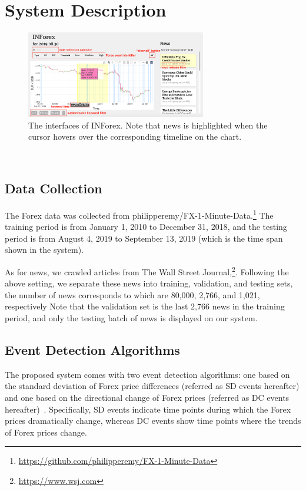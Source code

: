 \documentclass[runningheads]{llncs}
\begin{document}
\section{System Description}\label{sec:system}
\vspace{-0.9cm}
\begin{figure}
  \centering
  \includegraphics[width=0.7\textwidth]{hover.pdf}
  \caption{The interfaces of INForex. Note that news is highlighted when the cursor hovers over the
  corresponding timeline on the chart.}
  \label{fig:hover}
\end{figure}\
\vspace{-1.7cm}

\subsection{Data Collection}
\vspace{-0.3cm}
The Forex data was collected from
philipperemy/FX-1-Minute-Data.\footnote{\url{https://github.com/philipperemy/FX-1-Minute-Data}}
The training period is from January 1, 2010 to December 31, 2018, and the testing period is from August 4, 2019 to September 13, 2019 (which is the time span shown in the system). 

As for news, we crawled articles from The Wall Street
Journal,\footnote{\url{https://www.wsj.com}}. Following the above setting, we separate these news into training, validation, and testing sets, the number of news corresponds to which are 80,000, 2,766, and 1,021, respectively
Note that the validation set is the last 2,766 news in the training period, and only the testing batch of news is displayed on our system.
\vspace{-0.5cm}
\subsection{Event Detection Algorithms}\label{sec:algo}
\vspace{-0.2cm}
The proposed system comes with two event detection algorithms: one based on
the standard deviation of Forex price differences (referred as SD events hereafter) and one based on the directional change of Forex prices (referred
as DC events hereafter)~\cite{7850020}. 
Specifically, SD events indicate time points during which the Forex prices
dramatically change, whereas DC events show time points where the trends of
Forex prices change.
\end{document}

